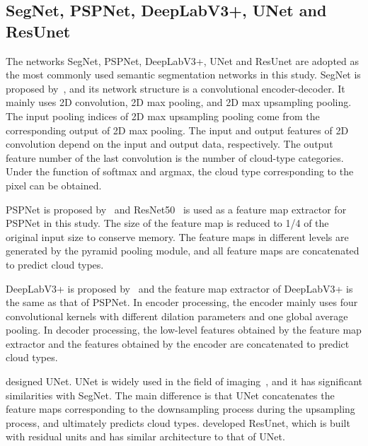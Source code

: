 \documentclass[review]{elsarticle}
\begin{document}
\subsection{SegNet, PSPNet, DeepLabV3+, UNet and ResUnet}
\label{section:SegNet}
The networks SegNet, PSPNet, DeepLabV3+, UNet and ResUnet are adopted as the most commonly used semantic segmentation networks in this study.
SegNet is proposed by~\citet{SegNet}, and its network structure is a convolutional encoder-decoder.
It mainly uses 2D convolution, 2D max pooling, and 2D max upsampling pooling.
The input pooling indices of 2D max upsampling pooling come from the corresponding output of 2D max pooling.
The input and output features of 2D convolution depend on the input and output data, respectively.
The output feature number of the last convolution is the number of cloud-type categories.
Under the function of softmax and argmax, the cloud type corresponding to the pixel can be obtained.

PSPNet is proposed by~\citet{PSPNet} and ResNet50~\citep{ResNet} is used as a feature map extractor for PSPNet in this study.
The size of the feature map is reduced to 1/4 of the original input size to conserve memory.
The feature maps in different levels are generated by the pyramid pooling module, and all feature maps are concatenated to predict cloud types.

DeepLabV3+ is proposed by~\citet{DeepLabV3plus} and the feature map extractor of DeepLabV3+ is the same as that of PSPNet.
In encoder processing, the encoder mainly uses four convolutional kernels with different dilation parameters and one global average pooling.
In decoder processing, the low-level features obtained by the feature map extractor and the features obtained by the encoder are concatenated to predict cloud types.

\citet{UNet} designed UNet.
UNet is widely used in the field of imaging~\citep{WALDNER2020111741, rs15092246, YOO2022102678, AMINIAMIRKOLAEE2022113014, rs15061706}, and it has significant similarities with SegNet.
The main difference is that UNet concatenates the feature maps corresponding to the downsampling process during the upsampling process, and ultimately predicts cloud types.
\citet{ResUnet} developed ResUnet, which is built with residual units and has similar architecture to that of UNet.
\end{document}
